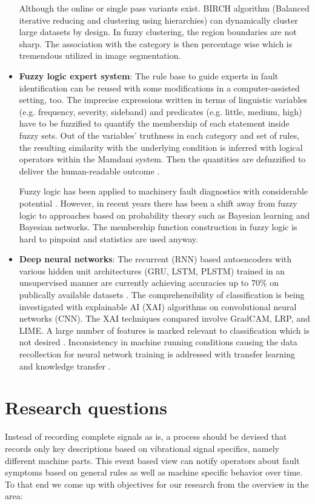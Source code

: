\documentclass[11pt, a4paper, english]{article}
\begin{document}
\begin{refsection}
\begin{itemize}
Although the online or single pass variants exist. BIRCH algorithm (Balanced iterative reducing and clustering using hierarchies) can dynamically cluster large datasets by design. In fuzzy clustering, the region boundaries are not sharp. The association with the category is then percentage wise which is tremendous utilized in image segmentation. 

\item \textbf{Fuzzy logic expert system}: The rule base to guide experts in fault identification can be reused with some modifications in a computer-assisted setting, too. The imprecise expressions written in terms of linguistic variables (e.g. frequency, severity, sideband)  and predicates (e.g. little, medium, high) have to be fuzzified to quantify the membership of each statement inside fuzzy sets. Out of the variables' truthness in each category and set of rules, the resulting similarity with the underlying condition is inferred with logical operators within the Mamdani system. Then the quantities are defuzzified to deliver the human-readable outcome \cite{chen_introduction_2001}. 

Fuzzy logic has been applied to machinery fault diagnostics with considerable potential \cite{mechefske_objective_1998}. However, in recent years there has been a shift away from fuzzy logic \cite{hullermeier_does_2015} to approaches based on probability theory such as Bayesian learning and Bayesian networks. The membership function construction in fuzzy logic is hard to pinpoint and statistics are used anyway.

\item \textbf{Deep neural networks}: The recurrent (RNN) based autoencoders with various hidden unit architectures (GRU, LSTM, PLSTM) trained in an unsupervised manner are currently achieving accuracies up to 70\% on publically available datasets \cite{yu_analysis_2021}. The comprehensibility of classification is being investigated with explainable AI (XAI) algorithms on convolutional neural networks (CNN). The XAI techniques compared involve GradCAM, LRP, and LIME. A large number of features is marked relevant to classification which is not desired \cite{mey_explainable_2022}. Inconsistency in machine running conditions causing the data recollection for neural network training is addressed with transfer learning and knowledge transfer \cite{maurya_condition-based_2021}.
\end{itemize}

\section{Research questions}
Instead of recording complete signals as is, a process should be devised that records only key descriptions based on vibrational signal specifics, namely different machine parts. This event based view can notify operators about fault symptoms based on general rules as well as machine specific behavior over time. To that end we come up with objectives for our research from the overview in the area: 


\end{refsection}
\end{document}
